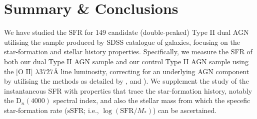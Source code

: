 \section{Summary \& Conclusions}

We have studied the $\text{SFR}$ for 149 candidate (double-peaked) Type II dual AGN utilising the sample produced by \cite{Liu_2009} SDSS catalogue of galaxies, focusing on the star-formation and stellar history properties. Specifically, we measure the SFR of both our dual Type II AGN sample and our control Type II AGN sample using the $\text{[O II]}$ $\lambda3727$Å line luminosity, correcting for an underlying AGN component by utilising the methods as detailed by \cite{Ho_2005}, \cite{Kim_2006} and \cite{Silverman_2009}). We supplement the study of the instantaneous SFR with properties that trace the star-formation history, notably the $\text{D}_{n}(4000)$ spectral index, and also the stellar mass from which the specefic star-formation rate ($\text{sSFR}$; i.e., $\log{(\text{SFR}/M_{*})}$) can be ascertained.    
  
  
  
  
  
  